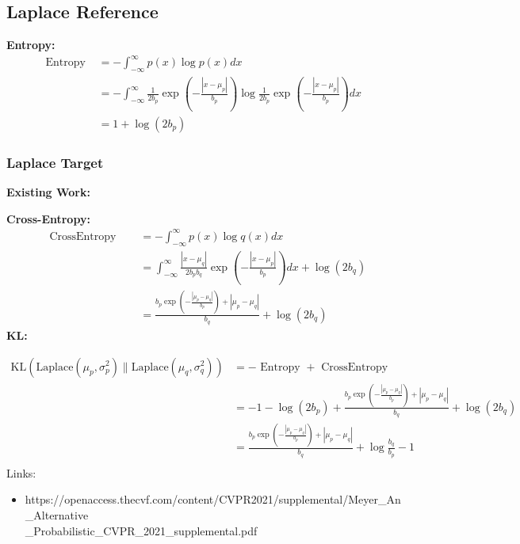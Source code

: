 \documentclass{article}
\begin{document}
\subsection{Laplace Reference}

\noindent \textbf{Entropy:}
$$ \begin{aligned} \text { Entropy }&=-\int_{-\infty}^{\infty} p(x) \log p(x) d x\\&=-\int_{-\infty}^{\infty}\frac{1}{2 b_{p}} \exp \left(-\frac{\left|x-\mu_{p}\right|}{b_{p}}\right) \log \frac{1}{2 b_{p}} \exp \left(-\frac{\left|x-\mu_{p}\right|}{b_{p}}\right) d x&\\&=1+\log \left(2 b_{p}\right)
\end{aligned} $$

\subsubsection{Laplace Target}

\noindent \textbf{Existing Work:}

\noindent \textbf{Cross-Entropy:}
$$ \begin{aligned} \text { CrossEntropy }
\quad &=-\int_{-\infty}^{\infty} p(x) \log q(x) d x \\
\quad &=\int_{-\infty}^{\infty} \frac{\left|x-\mu_{q}\right|}{2 b_{p} b_{q}} \exp \left(-\frac{\left|x-\mu_{p}\right|}{b_{p}}\right) d x+\log \left(2 b_{q}\right)\\&=\frac{b_{p} \exp \left(-\frac{\left|\mu_{p}-\mu_{q}\right|}{b_{p}}\right)+\left|\mu_{p}-\mu_{q}\right|}{b_{q}}+\log \left(2 b_{q}\right)
\end{aligned}
 $$
\noindent \textbf{KL:}

$$ \begin{aligned}\mathrm{KL}\left(\mathrm{Laplace}\left(\mu_{p}, \sigma_{p}^{2}\right) \| \mathrm{Laplace}\left(\mu_{q}, \sigma_{q}^{2}\right)\right)&=-\text { Entropy }+\text{ CrossEntropy }\\&=-1-\log \left(2 b_{p}\right)+\frac{b_{p} \exp \left(-\frac{\left|\mu_{p}-\mu_{q}\right|}{b_{p}}\right)+\left|\mu_{p}-\mu_{q}\right|}{b_{q}}+\log \left(2 b_{q}\right)\\&=\frac{b_{p} \exp \left(-\frac{\left|\mu_{p}-\mu_{q}\right|}{b_{p}}\right)+\left|\mu_{p}-\mu_{q}\right|}{b_{q}}+\log \frac{b_{q}}{b_{p}}-1\\
\end{aligned}
$$
Links:
\begin{itemize}
    \item  https://openaccess.thecvf.com/content/CVPR2021/supplemental/Meyer\_An\_Alternative\\\_Probabilistic\_CVPR\_2021\_supplemental.pdf
\end{itemize}
\end{document}
